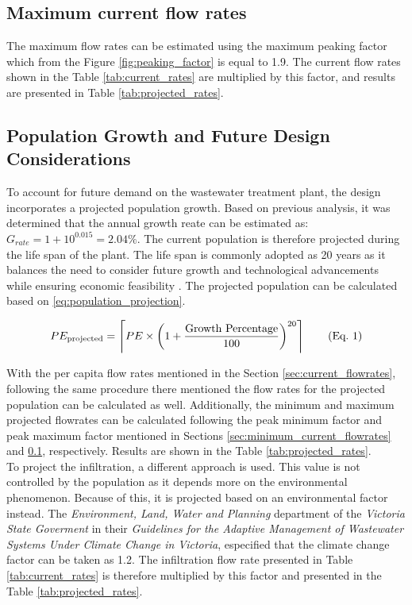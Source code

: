 \documentclass[12pt]{article}
\begin{document}
\subsection{Maximum current flow rates}
\label{sec:maximum_current_flowrates}

The maximum flow rates can be estimated using the maximum peaking factor
which from the Figure \ref{fig:peaking_factor} is equal to 1.9. The current flow rates shown in the Table \ref{tab:current_rates}
are multiplied by this factor, and results are presented in Table \ref{tab:projected_rates}.

\subsection*{Population Growth and Future Design Considerations}

To account for future demand on the wastewater treatment plant, the design incorporates a projected population 
growth. Based on previous analysis, it was determined that 
the annual growth reate can be estimated as: \(G_{rate} = 1 + 10^{0.015} =2.04\%\).
The current population is therefore projected during the life span of the plant. The life span is 
commonly adopted as 20 years as it balances the need to consider future growth and 
technological advancements while ensuring economic feasibility \cite{wef_DesignWaterResource}.
The projected population can be calculated based on \eqref{eq:population_projection}. 


\begin{align}
  \refstepcounter{equation}
  PE_{\text{projected}} = \left\lceil PE \times \left(1 + \frac{\text{Growth Percentage}}{100} \right)^{20} \right\rceil 
  \tag{Eq.~\theequation} \label{eq:population_projection}
\end{align}

With the per capita flow rates mentioned in the Section \ref{sec:current_flowrates}, following the same procedure there mentioned
the flow rates for the projected population can be calculated as well. Additionally, the minimum and maximum projected flowrates
can be calculated following the peak minimum factor and peak maximum factor mentioned in Sections \ref{sec:minimum_current_flowrates}
and \ref{sec:maximum_current_flowrates}, respectively. Results are shown in the Table \ref{tab:projected_rates}.\\

To project the infiltration, a different approach is used. This value is not controlled by
the population as it depends more on the environmental phenomenon. Because of this, it is projected
based on an environmental factor instead. The \textit{Environment, Land, Water and Planning} department
of the \textit{Victoria State Goverment} in their \textit{Guidelines for the Adaptive Management of 
Wastewater Systems Under Climate Change in Victoria}, especified that the climate change factor
can be taken as 1.2. The infiltration flow rate presented in Table \ref{tab:current_rates} is therefore multiplied by this
factor and presented in the Table \ref{tab:projected_rates}.
\end{document}

